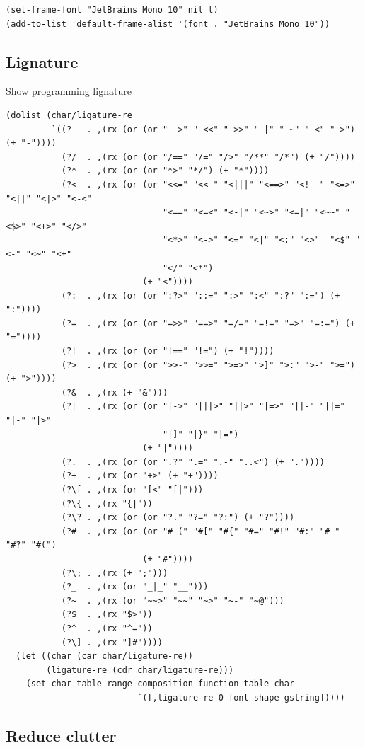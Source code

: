 \documentclass[11pt]{article}
\begin{document}
\begin{verbatim}
(set-frame-font "JetBrains Mono 10" nil t)
(add-to-list 'default-frame-alist '(font . "JetBrains Mono 10"))
\end{verbatim}

\subsection{Lignature}
\label{sec:org3c73dd6}

Show programming lignature

\begin{verbatim}
(dolist (char/ligature-re
         `((?-  . ,(rx (or (or "-->" "-<<" "->>" "-|" "-~" "-<" "->") (+ "-"))))
           (?/  . ,(rx (or (or "/==" "/=" "/>" "/**" "/*") (+ "/"))))
           (?*  . ,(rx (or (or "*>" "*/") (+ "*"))))
           (?<  . ,(rx (or (or "<<=" "<<-" "<|||" "<==>" "<!--" "<=>" "<||" "<|>" "<-<"
                               "<==" "<=<" "<-|" "<~>" "<=|" "<~~" "<$>" "<+>" "</>"
                               "<*>" "<->" "<=" "<|" "<:" "<>"  "<$" "<-" "<~" "<+"
                               "</" "<*")
                           (+ "<"))))
           (?:  . ,(rx (or (or ":?>" "::=" ":>" ":<" ":?" ":=") (+ ":"))))
           (?=  . ,(rx (or (or "=>>" "==>" "=/=" "=!=" "=>" "=:=") (+ "="))))
           (?!  . ,(rx (or (or "!==" "!=") (+ "!"))))
           (?>  . ,(rx (or (or ">>-" ">>=" ">=>" ">]" ">:" ">-" ">=") (+ ">"))))
           (?&  . ,(rx (+ "&")))
           (?|  . ,(rx (or (or "|->" "|||>" "||>" "|=>" "||-" "||=" "|-" "|>"
                               "|]" "|}" "|=")
                           (+ "|"))))
           (?.  . ,(rx (or (or ".?" ".=" ".-" "..<") (+ "."))))
           (?+  . ,(rx (or "+>" (+ "+"))))
           (?\[ . ,(rx (or "[<" "[|")))
           (?\{ . ,(rx "{|"))
           (?\? . ,(rx (or (or "?." "?=" "?:") (+ "?"))))
           (?#  . ,(rx (or (or "#_(" "#[" "#{" "#=" "#!" "#:" "#_" "#?" "#(")
                           (+ "#"))))
           (?\; . ,(rx (+ ";")))
           (?_  . ,(rx (or "_|_" "__")))
           (?~  . ,(rx (or "~~>" "~~" "~>" "~-" "~@")))
           (?$  . ,(rx "$>"))
           (?^  . ,(rx "^="))
           (?\] . ,(rx "]#"))))
  (let ((char (car char/ligature-re))
        (ligature-re (cdr char/ligature-re)))
    (set-char-table-range composition-function-table char
                          `([,ligature-re 0 font-shape-gstring]))))
\end{verbatim}

\subsection{Reduce clutter}
\label{sec:orgc5063a7}
\end{document}
